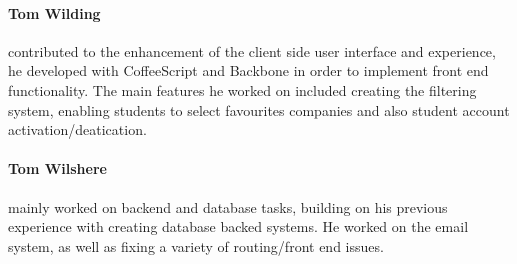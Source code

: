     \paragraph{Tom Wilding} contributed to the enhancement of the client side user interface and experience, he developed with CoffeeScript and Backbone in order to implement front end functionality. The main features he worked on included creating the filtering system, enabling students to select favourites companies and also student account activation/deatication.
    \paragraph{Tom Wilshere} mainly worked on backend and database tasks, building on his previous experience with creating database backed systems. He worked on the email system, as well as fixing a variety of routing/front end issues. 
